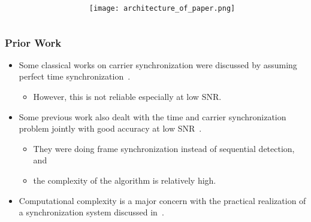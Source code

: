 \begin{frame}
\begin{columns}
\begin{column}{0.54\textwidth}
      \end{column} 

    \begin{column}{0.46\textwidth} 

        \begin{center}
          \texttt{[image: architecture\_of\_paper.png]}
        \end{center}
      
      \end{column}
    \end{columns}

\end{frame}

\begin{frame}
  \frametitle{Prior Work}
  \begin{itemize}
      \item Some classical works on carrier synchronization were discussed by assuming perfect time synchronization~\cite{Morelli_Mengali_98}.
      \begin{itemize}
        \item  However, this is not reliable especially at low SNR.
      \end{itemize}
      \item Some previous work also dealt with the time and carrier synchronization problem jointly with good accuracy at low SNR~\cite{purushothaman_16,kim_17}. 
      \begin{itemize}
        \item They were doing frame synchronization instead of sequential detection, and 
        \item the complexity of the algorithm is relatively high.
      \end{itemize}
      \item Computational complexity is a major concern with the practical realization of a synchronization system discussed in~\cite{murin_16,wang_21}.
  
  \end{itemize}
\end{frame}